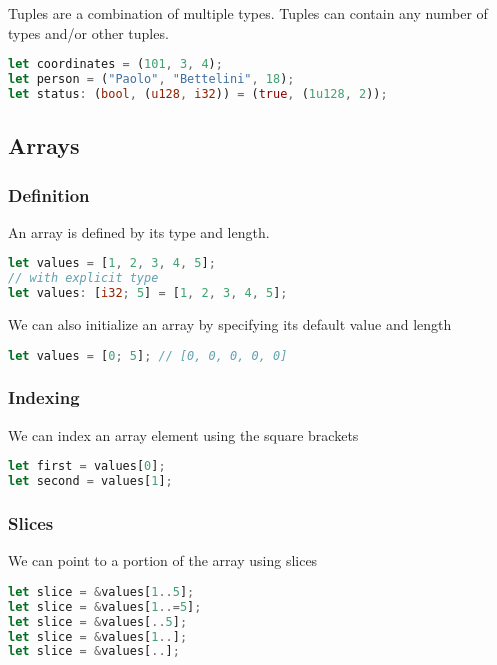 \documentclass{article}
\begin{document}
Tuples are a combination of multiple types.
Tuples can contain any number of types and/or other tuples.

\begin{lstlisting}[language=Rust, style=boxed, numbers=none]
let coordinates = (101, 3, 4);
let person = ("Paolo", "Bettelini", 18);
let status: (bool, (u128, i32)) = (true, (1u128, 2));
\end{lstlisting}

\subsection{Arrays}

\subsubsection{Definition}

An array is defined by its type and length.

\begin{lstlisting}[language=Rust, style=boxed, numbers=none]
let values = [1, 2, 3, 4, 5];
// with explicit type
let values: [i32; 5] = [1, 2, 3, 4, 5];
\end{lstlisting}

We can also initialize an array by specifying its default value and length

\begin{lstlisting}[language=Rust, style=boxed, numbers=none]
let values = [0; 5]; // [0, 0, 0, 0, 0]
\end{lstlisting}

\subsubsection{Indexing}

We can index an array element using the square brackets

\begin{lstlisting}[language=Rust, style=boxed, numbers=none]
let first = values[0];
let second = values[1];
\end{lstlisting}

\subsubsection{Slices}

We can point to a portion of the array using slices

\begin{lstlisting}[language=Rust, style=boxed, numbers=none]
let slice = &values[1..5];
let slice = &values[1..=5];
let slice = &values[..5];
let slice = &values[1..];
let slice = &values[..];
\end{lstlisting}
\end{document}
